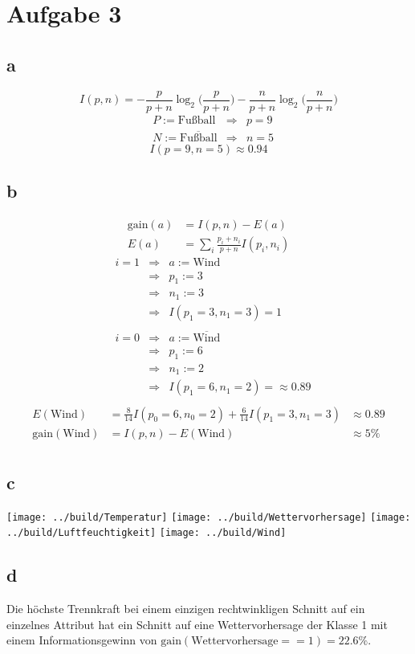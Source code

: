 \newpage\section*{Aufgabe 3}
\subsection*{a}
\begin{equation}
I(p,n) = -\frac{p}{p+n}\log_2\biggl(\frac{p}{p+n}\biggr)-\frac{n}{p+n}\log_2\biggl(\frac{n}{p+n}\biggr)
\end{equation}
\begin{align*}
& P := \text{Fußball}&\Rightarrow & p = 9\\
& N := \overline{\text{Fußball}}&\Rightarrow & n = 5
\end{align*}
\begin{equation*}
I(p=9,n=5) \approx 0.94
\end{equation*}

\subsection*{b}
\begin{align}
\text{gain}(a) &= I(p,n) - E(a)\\
E(a) &= \sum_i \frac{p_i+n_i}{p+n}I(p_i,n_i)
\end{align}
\begin{align*}
& i = 1 &\Rightarrow & a := \text{Wind}\\
&&\Rightarrow & p_1 := 3\\
&&\Rightarrow & n_1 := 3\\
&&\Rightarrow & I(p_1=3,n_1=3) = 1\\\\
& i = 0 &\Rightarrow &  a := \overline{\text{Wind}}\\
&&\Rightarrow & p_1 := 6\\
&&\Rightarrow & n_1 := 2\\
&&\Rightarrow & I(p_1=6,n_1=2) = \approx 0.89\\
\end{align*}
\begin{align*}
E(\text{Wind}) &= \frac{8}{14}I(p_0=6,n_0=2) + \frac{6}{14}I(p_1=3,n_1=3)&\approx 0.89\\
\text{gain}(\text{Wind}) &= I(p,n) - E(\text{Wind}) &\approx 5\%\\
\end{align*}
\subsection*{c}
\texttt{[image: ../build/Temperatur]}\newline
\texttt{[image: ../build/Wettervorhersage]}\newline
\texttt{[image: ../build/Luftfeuchtigkeit]}\newline
\texttt{[image: ../build/Wind]}\newline
\subsection*{d}
Die höchste Trennkraft bei einem einzigen rechtwinkligen Schnitt auf ein einzelnes Attribut hat ein Schnitt auf eine Wettervorhersage der Klasse 1 mit einem Informationsgewinn von $\text{gain}(\text{Wettervorhersage}==1)=22.6\%$.


